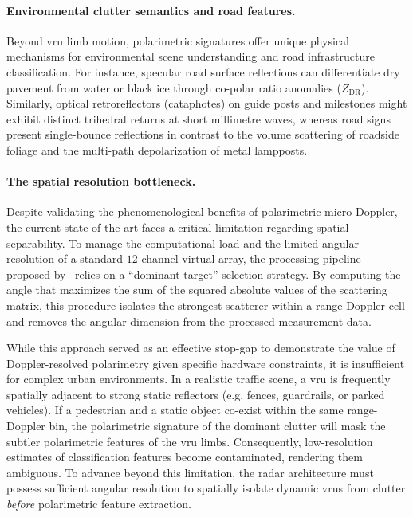 \paragraph{Environmental clutter semantics and road features.}
Beyond \gls{vru} limb motion, polarimetric signatures offer unique physical mechanisms for environmental scene understanding and road infrastructure classification.
For instance, specular road surface reflections can differentiate dry pavement from water or black ice through co-polar ratio anomalies ($Z_{\mathrm{DR}}$).
Similarly, optical retroreflectors (cataphotes) on guide posts and milestones might exhibit distinct trihedral returns at short millimetre waves, whereas road signs present single-bounce reflections in contrast to the volume scattering of roadside foliage and the multi-path depolarization of metal lampposts.

\paragraph{The spatial resolution bottleneck.}
Despite validating the phenomenological benefits of polarimetric micro-Doppler, the current state of the art faces a critical limitation regarding spatial separability.
To manage the computational load and the limited angular resolution of a standard $12$-channel virtual array, the processing pipeline proposed by~\textcite{bouwmeesterClassificationDynamicVulnerable2025} relies on a \enquote{dominant target} selection strategy.
By computing the angle that maximizes the sum of the squared absolute values of the scattering matrix, this procedure isolates the strongest scatterer within a range-Doppler cell and removes the angular dimension from the processed measurement data.

While this approach served as an effective stop-gap to demonstrate the value of Doppler-resolved polarimetry given specific hardware constraints, it is insufficient for complex urban environments.
In a realistic traffic scene, a \gls{vru} is frequently spatially adjacent to strong static reflectors (e.g. fences, guardrails, or parked vehicles).
If a pedestrian and a static object co-exist within the same range-Doppler bin, the polarimetric signature of the dominant clutter will mask the subtler polarimetric features of the \gls{vru} limbs.
Consequently, low-resolution estimates of classification features become contaminated, rendering them ambiguous.
To advance beyond this limitation, the radar architecture must possess sufficient angular resolution to spatially isolate dynamic \glspl{vru} from clutter \emph{before} polarimetric feature extraction.


